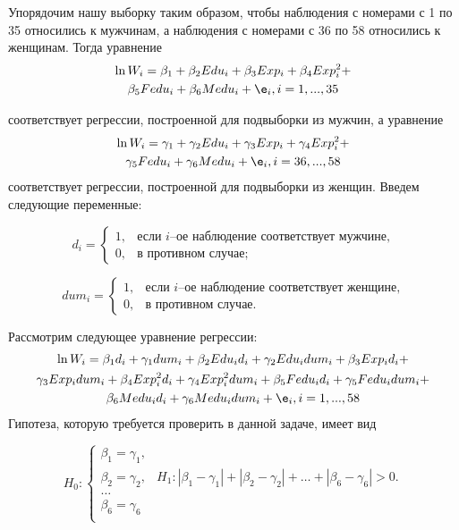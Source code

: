 \documentclass[pdftex,11pt,openany]{book}\usepackage[]{graphicx}\usepackage[]{color}
\begin{document}
\begin{solution}

Упорядочим нашу выборку таким образом, чтобы наблюдения с номерами с 1 по 35 относились к мужчинам, а наблюдения с номерами с 36 по 58 относились к женщинам.
Тогда уравнение
\begin{multline}
\ln W_i=\beta_1+\beta_2 Edu_i+\beta_3 Exp_i+\beta_4 Exp_i^2+\\
\beta_5 Fedu_i+\beta_6 Medu_i+\e_i, i=1,...,35
\end{multline}

соответствует регрессии, построенной для подвыборки из мужчин, а уравнение
\begin{multline}
\ln W_i=\gamma_1+\gamma_2 Edu_i+\gamma_3 Exp_i+\gamma_4 Exp_i^2+\\
\gamma_5 Fedu_i+\gamma_6 Medu_i+\e_i, i=36,...,58
\end{multline}
соответствует регрессии, построенной для подвыборки из женщин. Введем следующие переменные:

\[
d_i =
\begin{cases}
    1, & \text{если $i$--ое наблюдение соответствует мужчине,} \\
    0, & \text{в противном случае;}
\end{cases}
\]

\[
dum_i =
\begin{cases}
    1, & \text{если $i$--ое наблюдение соответствует женщине,} \\
    0, & \text{в противном случае.}
\end{cases}
\]

Рассмотрим следующее уравнение регрессии:
\begin{multline}
\ln W_i=\beta_1 d_i+\gamma_1 dum_i+\beta_2 Edu_i d_i+\gamma_2
Edu_i dum_i+\beta_3 Exp_i d_i+\\
\gamma_3 Exp_i dum_i+\beta_4 Exp_i^2 d_i + \gamma_4 Exp_i^2 dum_i + \beta_5 Fedu_i d_i +\gamma_5 Fedu_i dum_i+\\
\beta_6 Medu_i d_i+\gamma_6 Medu_i dum_i+\e_i, i=1,...,58
\end{multline}
Гипотеза, которую требуется проверить в данной задаче, имеет вид

\[
H_0: 
  \begin{cases}
    \beta_1 =\gamma_1, \\
    \beta_2 =\gamma_2 , & H_1:|\beta_1-\gamma_1|+|\beta_2-\gamma_2|+\dots+|\beta_6-\gamma_6| > 0.\\
    \dots   \\
    \beta_6=\gamma_6 \\
 \end{cases}
\]


\end{solution}
\end{document}
